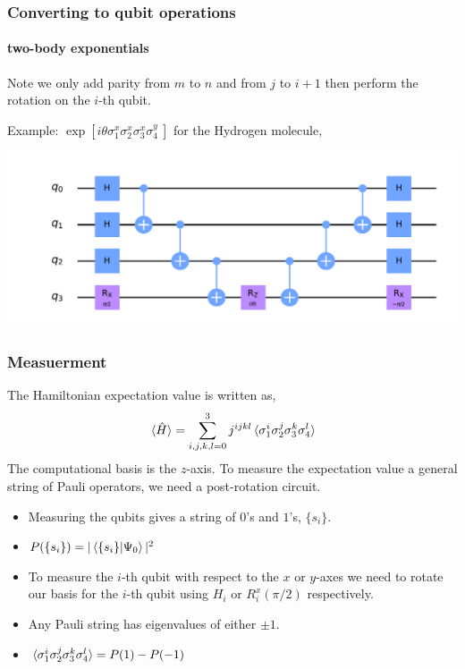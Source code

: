 \documentclass{beamer}
\renewcommand{\(}{\left(}
\renewcommand{\)}{\right)}
\renewcommand{\[}{\left[}
\renewcommand{\]}{\right]}
\begin{document}
\begin{frame}
    \frametitle{Converting to qubit operations}
    \framesubtitle{two-body exponentials}
    Note we only add parity from $m$ to $n$ and from $j$ to $i+1$ then perform the rotation on the $i$-th qubit.
     
    Example: $\exp{\[ i\theta \sigma^x_1 \sigma^x_2 \sigma^x_3 \sigma^y_4  \ \]}$ for the Hydrogen molecule, 

    \begin{center}
        \includegraphics[scale=0.45, trim = 65 0 0 0 , clip]{a1a2a3a4_r.pdf}
    \end{center}
\end{frame}

\begin{frame}
    \frametitle{Measuerment}
    The Hamiltonian expectation value is written as, 
    \begin{align*}
        \ev*{\hat{H}} = \sum_{i,j,k,l = 0}^ 3 j^{ijkl}\ev*{\sigma^i_1 \sigma^j_2 \sigma^k_3 \sigma^l_4} 
    \end{align*}
    The computational basis is the $z$-axis. To measure the expectation value a general string of Pauli operators, we need a post-rotation circuit. 
    \begin{itemize}
        \item Measuring the qubits gives a string of $0$'s and $1$'s, $\{s_i\}$.
        \item $P(\{ s_i \}) = |\braket{\{s_i\}}{\Psi_0}|^2$
        \item To measure the $i$-th qubit with respect to the $x$ or $y$-axes we need to rotate our basis for the $i$-th qubit using $H_i$ or $R_i^{x}(\pi/2)$ respectively. 
        \item Any Pauli string has eigenvalues of either $\pm 1$.
        \item $\ev*{\sigma^i_1 \sigma^j_2 \sigma^k_3 \sigma^l_4} = P(1) - P(-1)$ 
    \end{itemize}
\end{frame}
\end{document}

